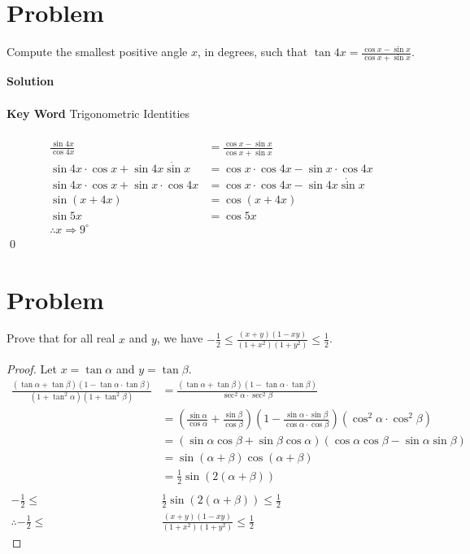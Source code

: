 \documentclass{article}
\newenvironment{solution}{\begin{trivlist}\item[]{\bf Solution}}{\qed \end{trivlist}}
\begin{document}
\section*{Problem}
Compute the smallest positive angle $x$, in degrees, such that $\tan4x = \frac{\cos{x} - \sin{x}}{\cos{x} + \sin{x}}$.
\begin{solution}
\\\\
\textbf{Key Word} Trigonometric Identities
\\\\
\begin{align*}
    \frac{\sin4x}{\cos4x} &= \frac{\cos{x} - \sin{x}}{\cos{x} + \sin{x}} \\
    \sin4x \cdot \cos{x} + \sin4x \dot \sin{x} &= \cos{x} \cdot \cos4x - \sin{x} \cdot \cos4x \\
    \sin4x \cdot \cos{x} + \sin{x} \cdot \cos4x &= \cos{x} \cdot \cos4x - \sin4x \dot \sin{x} \\
    \sin(x + 4x) &= \cos(x + 4x) \\
    \sin5x &= \cos 5x \\
    \therefore x \Rightarrow \boxed{9^{\circ}}
\end{align*}
\end{solution}

\section*{Problem}
Prove that for all real $x$ and $y$, we have $-\frac{1}{2} \le \frac{(x + y)(1 - xy)}{(1 + x^2)(1 + y^2)} \le \frac{1}{2}$.
\begin{proof}
    Let $x = \tan\alpha$ and $y = \tan\beta$.
    \begin{align*}
        \frac{(\tan\alpha + \tan\beta)(1 - \tan\alpha \cdot \tan\beta)}{(1 + \tan^2\alpha)(1 + \tan^2\beta)}
        &= \frac{(\tan\alpha + \tan\beta)(1 - \tan\alpha \cdot \tan\beta)}{\sec^2\alpha \cdot \sec^2\beta} \\[0.7em]
        &= \left( \frac{\sin\alpha}{\cos\alpha} + \frac{\sin\beta}{\cos\beta} \right) \left( 1 - \frac{\sin\alpha \cdot \sin\beta}{\cos\alpha \cdot \cos\beta} \right) (\cos^2\alpha \cdot \cos^2\beta) \\[0.7em]
        &= (\sin\alpha\cos\beta + \sin\beta\cos\alpha)(\cos\alpha\cos\beta - \sin\alpha\sin\beta) \\[0.7em]
        &= \sin(\alpha + \beta)\cos(\alpha + \beta) \\[0.7em]
        &= \frac{1}{2}\sin(2(\alpha + \beta))
        \\\\
        -\frac{1}{2} \le &\frac{1}{2}\sin(2(\alpha + \beta)) \le \frac{1}{2} \\
        \therefore -\frac{1}{2} \le &\frac{(x + y)(1 - xy)}{(1 + x^2)(1 + y^2)} \le \frac{1}{2}
    \end{align*}
\end{proof}
\end{document}
